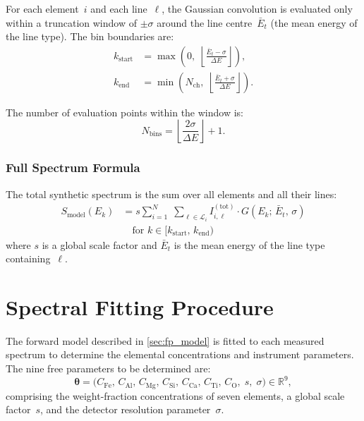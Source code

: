 \documentclass[journal,lettersize]{IEEEtran}
\begin{document}
For each element~$i$ and each line~$\ell$, the Gaussian convolution is
evaluated only within a truncation window of $\pm\sigma$ around the line
centre~$\bar{E}_t$ (the mean energy of the line type).  The bin
boundaries are:
\begin{align}
  k_{\mathrm{start}} &= \max\!\left(0,\;
    \left\lfloor\frac{\bar{E}_t - \sigma}{\Delta E}
    \right\rfloor\right), \label{eq:binstart}\\
  k_{\mathrm{end}} &= \min\!\left(N_{\mathrm{ch}},\;
    \left\lfloor\frac{\bar{E}_t + \sigma}{\Delta E}
    \right\rfloor\right). \label{eq:binend}
\end{align}

The number of evaluation points within the window is:
\begin{equation}\label{eq:num_bins}
  N_{\mathrm{bins}} = \left\lfloor
    \frac{2\sigma}{\Delta E}
  \right\rfloor + 1.
\end{equation}

\subsubsection{Full Spectrum Formula}

The total synthetic spectrum is the sum over all elements and all their
lines:
\begin{equation}\label{eq:spectrum}
  \boxed{
    \begin{aligned}
      S_{\mathrm{model}}(E_k) &= s \sum_{i=1}^{N}\;\sum_{\ell \in \mathcal{L}_i}
        I_{i,\ell}^{(\mathrm{tot})} \cdot G(E_k;\,\bar{E}_t,\,\sigma) \\
      &\quad\text{for } k \in [k_{\mathrm{start}},\,k_{\mathrm{end}})
    \end{aligned}
  }
\end{equation}
where $s$ is a global scale factor and $\bar{E}_t$ is the mean energy
of the line type containing~$\ell$.

\section{Spectral Fitting Procedure}\label{sec:fitting}

The forward model described in \cref{sec:fp_model} is fitted to each
measured spectrum to determine the elemental concentrations and
instrument parameters.  The nine free parameters to be determined are:
\begin{equation}\label{eq:params}
  \boldsymbol{\theta} = \bigl(
    C_{\mathrm{Fe}},\, C_{\mathrm{Al}},\, C_{\mathrm{Mg}},\,
    C_{\mathrm{Si}},\, C_{\mathrm{Ca}},\, C_{\mathrm{Ti}},\,
    C_{\mathrm{O}},\; s,\; \sigma
  \bigr) \in \mathbb{R}^{9},
\end{equation}
comprising the weight-fraction concentrations of seven elements, a
global scale factor~$s$, and the detector resolution
parameter~$\sigma$.
\end{document}
